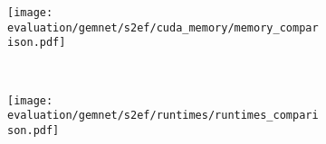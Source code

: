 \begin{figure}[H]
    \centering

    \begin{subfigure}[t]{0.48\textwidth}
        \centering
        \texttt{[image: evaluation/gemnet/s2ef/cuda\_memory/memory\_comparison.pdf]}
        \label{fig:gemnet-s2ef-memory-results}
    \end{subfigure}%
    ~
    \begin{subfigure}[t]{0.48\textwidth}
        \centering
        \texttt{[image: evaluation/gemnet/s2ef/runtimes/runtimes\_comparison.pdf]}
        \label{gemnet-s2ef-runtimes-results}
    \end{subfigure}

    \vspace*{-1em}


\end{figure}
